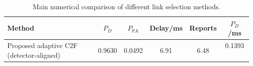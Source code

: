 \begin{table}[t]
    \centering
    \caption{Main numerical comparison of different link selection methods.}
    \label{tab:main_summary}
    \begin{tabular}{l c c c c c}
        \hline
        Method & $P_D$ & $P_{\mathrm{FA}}$ & Delay/ms & Reports & $P_D$/ms \\
        \hline
        Proposed adaptive C2F (detector-aligned) & 0.9630 & 0.0492 & 6.91 & 6.48 & 0.1393 \
        \hline
    \end{tabular}
\end{table}
